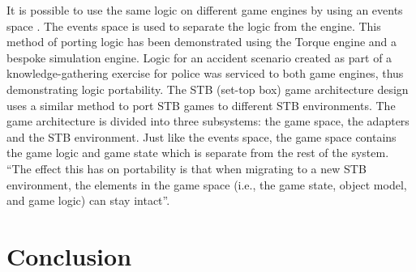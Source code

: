 \documentclass{scrartcl}
\begin{document}
It is possible to use the same logic on different game engines by using an events space \cite{GameLogic}. The events space is used to separate the logic from the engine. This method of porting logic has been demonstrated using the Torque engine and a bespoke simulation engine. Logic for an accident scenario created as part of a knowledge-gathering exercise for police was serviced to both game engines, thus demonstrating logic portability.
The STB (set-top box) game architecture design \cite{STB} uses a similar method to port STB games to different STB environments. The game architecture is divided into three subsystems: the game space, the adapters and the STB environment. Just like the events space, the game space contains the game logic and game state which is separate from the rest of the system. ``The effect this has on portability is that when migrating to a new STB environment, the elements in the game space (i.e., the game state, object model, and game logic) can stay intact''\cite{STB}.

\section{Conclusion}





\end{document}

